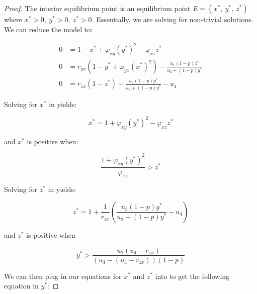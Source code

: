 \begin{proof}
    The interior equilibrium point is an equilibrium point $E=\left(x^*,\ y^*,\ z^*\right)$ where $x^*>0,\ y^*>0,\ z^*>0$. Essentially, we are solving  for non-trivial solutions. We can reduce the model to:

    \begin{subequations}\label{system:interior}
        \begin{align}
            0 &= 1-x^*+\varphi_{xy}\left(y^*\right)^2-\varphi_{xz}z^* \label{eq:interior-x}\\
            0 &= r_{yx}\left(1-y^*+\varphi_{yx}\left(x^*\right)^2\right)-\frac{u_1\left(1-p\right)z^*}{u_2+\left(1-p\right)y^*} \label{eq:interior-y}\\
            0 &= r_{zx}\left(1-z^*\right)+\frac{u_3\left(1-p\right)y^*}{u_2+\left(1-p\right)y^*}-u_4 \label{eq:interior-z}
        \end{align}
    \end{subequations}

    Solving for $x^*$ in  yields:

    \begin{equation*}
        x^*=1+\varphi_{xy}\left(y^*\right)^2-\varphi_{xz}z^*
    \end{equation*}

    and $x^*$ is positive when:

    \begin{equation*}
        \frac{1+\varphi_{xy}\left(y^*\right)^2}{\varphi_{xz}}>z^*
    \end{equation*}

    Solving for $z^*$ in  yields:

    \begin{equation*}
        z^*=1+\frac{1}{r_{zx}}\left(\frac{u_3\left(1-p\right)y^*}{u_2+\left(1-p\right)y^*}-u_4\right)
    \end{equation*}
    
    and $z^*$ is positive when

    \begin{equation*}
        y^*>\frac{u_2\left(u_4-r_{zx}\right)}{\left(u_3-\left(u_4-r_{zx}\right)\right)\left(1-p\right)}
    \end{equation*}

    We can then plug in our equations for $x^*$ and $z^*$ into  to get the following equation in $y^*$:


\end{proof}
